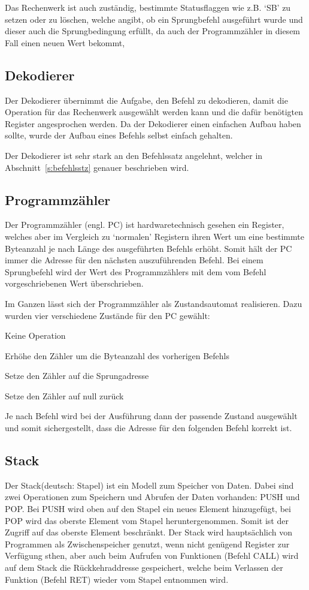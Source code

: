 Das Rechenwerk ist auch zuständig, bestimmte Statusflaggen wie z.B. `SB' zu
setzen oder zu löschen, welche angibt, ob ein Sprungbefehl ausgeführt wurde und
dieser auch die Sprungbedingung erfüllt, da auch der Programmzähler in diesem
Fall einen neuen Wert bekommt,
\clearpage
\pagebreak
\subsection{Dekodierer}
\label{s:decode}
Der Dekodierer übernimmt die Aufgabe, den Befehl zu dekodieren, damit die
Operation für das Rechenwerk ausgewählt werden kann und die dafür benötigten
Register angesprochen werden. Da der Dekodierer einen einfachen Aufbau haben
sollte, wurde der Aufbau eines Befehls selbst einfach gehalten.

Der Dekodierer ist sehr stark an den Befehlssatz angelehnt, welcher in
Abschnitt~\ref{s:befehlsstz} genauer beschrieben wird.
\subsection{Programmzähler}
\label{s:pc}
Der Programmzähler (engl. \ac{PC}) ist hardwaretechnisch gesehen ein Register,
welches aber im Vergleich zu `normalen' Registern ihren Wert um eine bestimmte
Byteanzahl je nach Länge des ausgeführten Befehls erhöht. Somit hält der \ac{PC}
immer die Adresse für den nächsten auszuführenden Befehl. Bei einem Sprungbefehl
wird der Wert des Programmzählers mit dem vom Befehl vorgeschriebenen Wert
überschrieben.

Im Ganzen lässt sich der Programmzähler als Zustandsautomat realisieren. Dazu
wurden vier verschiedene Zustände für den \ac{PC} gewählt:

\begin{description}[align=right, labelwidth=1.6cm]
\item[NOP]		Keine Operation
\item[INC]		Erhöhe den Zähler um die Byteanzahl des vorherigen Befehls
\item[ASSIGN]	Setze den Zähler auf die Sprungadresse
\item[RESET]	Setze den Zähler auf null zurück
\end{description}

Je nach Befehl wird bei der Ausführung dann der passende Zustand ausgewählt und
somit sichergestellt, dass die Adresse für den folgenden Befehl korrekt ist.
\pagebreak
\subsection{Stack}
\label{s:stack}
Der Stack(deutsch: Stapel) ist ein Modell zum Speicher von Daten. Dabei sind
zwei Operationen zum Speichern und Abrufen der Daten vorhanden: PUSH und POP\@.
Bei PUSH wird oben auf den Stapel ein neues Element hinzugefügt, bei POP wird
das oberste Element vom Stapel heruntergenommen. Somit ist der Zugriff auf das
oberste Element beschränkt. Der Stack wird hauptsächlich von Programmen als
Zwischenspeicher genutzt, wenn nicht genügend Register zur Verfügung sthen, aber
auch beim Aufrufen von Funktionen (Befehl CALL) wird auf dem Stack die Rückkehraddresse
gespeichert, welche beim Verlassen der Funktion (Befehl RET) wieder
vom Stapel entnommen wird.

